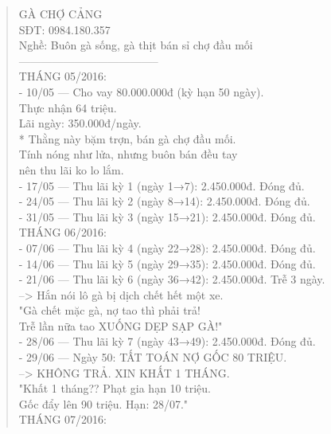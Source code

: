 \documentclass[12pt,a4paper]{article}
\begin{document}
\begin{quote}
\fontsize{9pt}{11pt}\selectfont\ttfamily
GÀ CHỢ CẢNG\\
SĐT: 0984.180.357\\
Nghề: Buôn gà sống, gà thịt bán sỉ chợ đầu mối\\
--------------------------------------\\
\vspace{0.2cm}
THÁNG 05/2016:\\
- 10/05 --- Cho vay 80.000.000đ (kỳ hạn 50 ngày).\\
          Thực nhận 64 triệu.\\
          Lãi ngày: 350.000đ/ngày.\\
          * Thằng này bặm trợn, bán gà chợ đầu mối.\\
            Tính nóng như lửa, nhưng buôn bán đều tay\\
            nên thu lãi ko lo lắm.\\
\vspace{0.2cm}
- 17/05 --- Thu lãi kỳ 1 (ngày 1→7): 2.450.000đ. Đóng đủ.\\
- 24/05 --- Thu lãi kỳ 2 (ngày 8→14): 2.450.000đ. Đóng đủ.\\
- 31/05 --- Thu lãi kỳ 3 (ngày 15→21): 2.450.000đ. Đóng đủ.\\
\vspace{0.2cm}
THÁNG 06/2016:\\
- 07/06 --- Thu lãi kỳ 4 (ngày 22→28): 2.450.000đ. Đóng đủ.\\
- 14/06 --- Thu lãi kỳ 5 (ngày 29→35): 2.450.000đ. Đóng đủ.\\
- 21/06 --- Thu lãi kỳ 6 (ngày 36→42): 2.450.000đ. Trễ 3 ngày.\\
          --> Hắn nói lô gà bị dịch chết hết một xe.\\
              "Gà chết mặc gà, nợ tao thì phải trả!\\
               Trễ lần nữa tao XUỐNG DẸP SẠP GÀ!"\\
- 28/06 --- Thu lãi kỳ 7 (ngày 43→49): 2.450.000đ. Đóng đủ.\\
- 29/06 --- Ngày 50: TẤT TOÁN NỢ GỐC 80 TRIỆU.\\
          --> KHÔNG TRẢ. XIN KHẤT 1 THÁNG.\\
              "Khất 1 tháng?? Phạt gia hạn 10 triệu.\\
               Gốc đẩy lên 90 triệu. Hạn: 28/07."\\
\vspace{0.2cm}
THÁNG 07/2016:\\

\end{quote}
\end{document}

